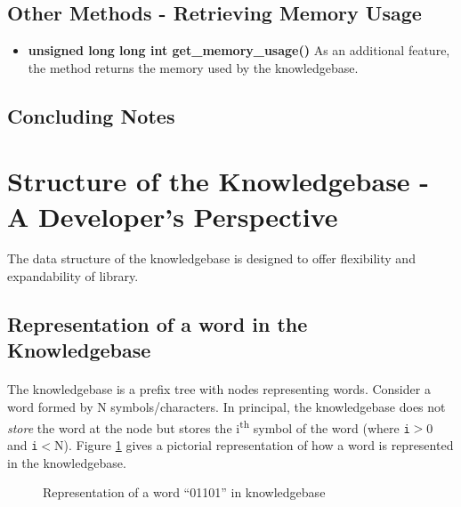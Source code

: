 \subsection*{Other Methods - Retrieving Memory Usage}

\begin{itemize}
  \item \textbf{unsigned long long int get\_memory\_usage()} \vskip 1pt
  As an additional feature, the method returns the memory used by the knowledgebase. 
\end{itemize}

\subsection*{Concluding Notes}


\section{Structure of the Knowledgebase - A Developer's Perspective}
The data structure of the knowledgebase is designed to offer flexibility and expandability of \libalf library. 

\subsection{Representation of a word in the Knowledgebase}
\paragraph{}
The knowledgebase is a prefix tree with nodes representing words. Consider a word formed by N symbols/characters. In principal, the knowledgebase does not \emph{store} the word at the node but stores the i\textsuperscript{th} symbol of the word (where \texttt{i}$>$0 and \texttt{i}$<$N). Figure \ref{knowledgebasepic} gives a pictorial representation of how a word is represented in the knowledgebase.


\begin{figure} [h]
\centering
{}
\caption{Representation of a word ``01101'' in knowledgebase}
\label{knowledgebasepic}
\end{figure}


